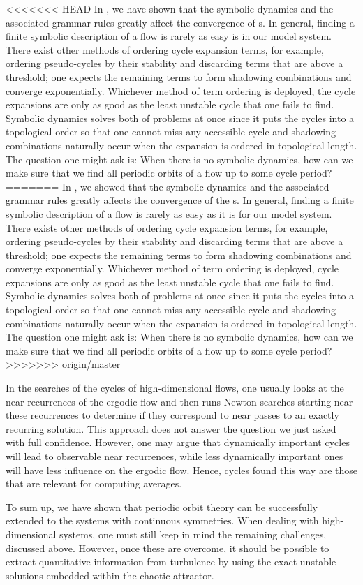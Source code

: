 <<<<<<< HEAD
In , we have shown that the symbolic dynamics and the
associated grammar rules greatly affect the convergence of \cycForm s.
In general, finding a finite symbolic description of a flow is
rarely as easy is in our model system.
There exist other methods of ordering cycle
expansion terms, for example, ordering pseudo-cycles by their stability and discarding terms
that are above a threshold; one expects the remaining terms to form
shadowing combinations and converge exponentially.
Whichever method of term ordering is deployed, the cycle expansions are only as good
as the least unstable cycle that one fails to find. Symbolic dynamics solves both
of problems at once since it puts the cycles into a topological order so that
one cannot miss any accessible cycle and shadowing combinations naturally occur
when the expansion is ordered in topological length. The question one might ask
is: When there is no symbolic dynamics, how can we make sure that we find all
periodic orbits of a flow up to some cycle period?
=======
In , we showed that the symbolic dynamics and the
associated grammar rules greatly affects the convergence of the \cycForm s.
In general, finding a finite symbolic description of a flow is rarely as easy as 
it is for our model system. There exists other methods of ordering cycle expansion 
terms, for example, ordering pseudo-cycles by their stability and discarding terms
that are above a threshold; one expects the remaining terms to form shadowing 
combinations and converge exponentially. Whichever method of term ordering is 
deployed, cycle expansions are only as good as the least unstable cycle that 
one fails to find. Symbolic dynamics solves both of problems at once since it puts 
the cycles into a topological order so that one cannot miss any accessible cycle 
and shadowing combinations naturally occur when the expansion is ordered in 
topological length. The question one might ask is: When there is no symbolic dynamics, 
how can we make sure that we find all periodic orbits of a flow up to some cycle 
period?
>>>>>>> origin/master

In the searches of the cycles of high-dimensional flows, one usually looks at
the near recurrences of the ergodic flow and then runs Newton searches
starting near these recurrences to determine if they correspond to near passes
to an exactly recurring solution. This approach does not answer the question 
we just asked with full confidence. However, one may argue that dynamically 
important cycles will lead to observable near recurrences, while less
dynamically important ones will have less influence on the ergodic flow. Hence, 
cycles found this way are those that are relevant for computing averages.

To sum up, we have shown that periodic orbit theory can be successfully extended to
the systems with continuous symmetries. When dealing with high-dimensional systems,
one must still keep in mind the remaining challenges, discussed above. However, once 
these are overcome, it should be possible to extract quantitative information 
from turbulence by using the exact unstable solutions embedded within the chaotic 
attractor.
